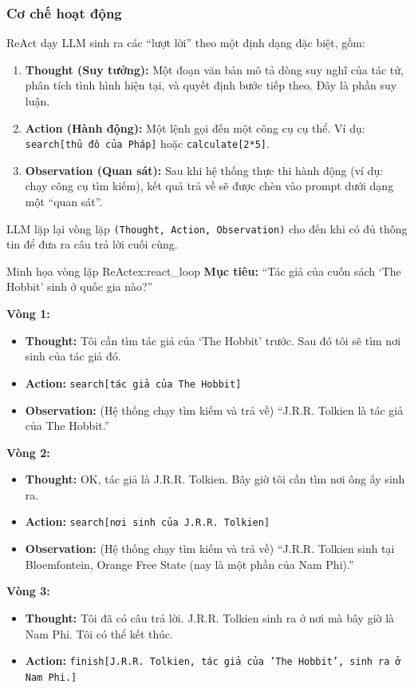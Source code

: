 \subsubsection{Cơ chế hoạt động}
ReAct dạy LLM sinh ra các “lượt lời” theo một định dạng đặc biệt, gồm:
\begin{enumerate}
    \item \textbf{Thought (Suy tưởng):} Một đoạn văn bản mô tả dòng suy nghĩ của tác tử, phân tích tình hình hiện tại, và quyết định bước tiếp theo. Đây là phần suy luận.
    \item \textbf{Action (Hành động):} Một lệnh gọi đến một công cụ cụ thể. Ví dụ: \texttt{search[thủ đô của Pháp]} hoặc \texttt{calculate[2*5]}.
    \item \textbf{Observation (Quan sát):} Sau khi hệ thống thực thi hành động (ví dụ: chạy công cụ tìm kiếm), kết quả trả về sẽ được chèn vào prompt dưới dạng một “quan sát”.
\end{enumerate}

LLM lặp lại vòng lặp \texttt{(Thought, Action, Observation)} cho đến khi có đủ thông tin để đưa ra câu trả lời cuối cùng.

\begin{example}{Minh họa vòng lặp ReAct}{ex:react_loop}
    \textbf{Mục tiêu:} “Tác giả của cuốn sách ‘The Hobbit’ sinh ở quốc gia nào?”
    
    \textbf{Vòng 1:}
    \begin{itemize}
        \item \textbf{Thought:} Tôi cần tìm tác giả của ‘The Hobbit’ trước. Sau đó tôi sẽ tìm nơi sinh của tác giả đó.
        \item \textbf{Action:} \texttt{search[tác giả của The Hobbit]}
        \item \textbf{Observation:} (Hệ thống chạy tìm kiếm và trả về) “J.R.R. Tolkien là tác giả của The Hobbit.”
    \end{itemize}

    \textbf{Vòng 2:}
    \begin{itemize}
        \item \textbf{Thought:} OK, tác giả là J.R.R. Tolkien. Bây giờ tôi cần tìm nơi ông ấy sinh ra.
        \item \textbf{Action:} \texttt{search[nơi sinh của J.R.R. Tolkien]}
        \item \textbf{Observation:} (Hệ thống chạy tìm kiếm và trả về) “J.R.R. Tolkien sinh tại Bloemfontein, Orange Free State (nay là một phần của Nam Phi).”
    \end{itemize}
    
    \textbf{Vòng 3:}
    \begin{itemize}
        \item \textbf{Thought:} Tôi đã có câu trả lời. J.R.R. Tolkien sinh ra ở nơi mà bây giờ là Nam Phi. Tôi có thể kết thúc.
        \item \textbf{Action:} \texttt{finish[J.R.R. Tolkien, tác giả của 'The Hobbit', sinh ra ở Nam Phi.]}
    \end{itemize}
\end{example}

